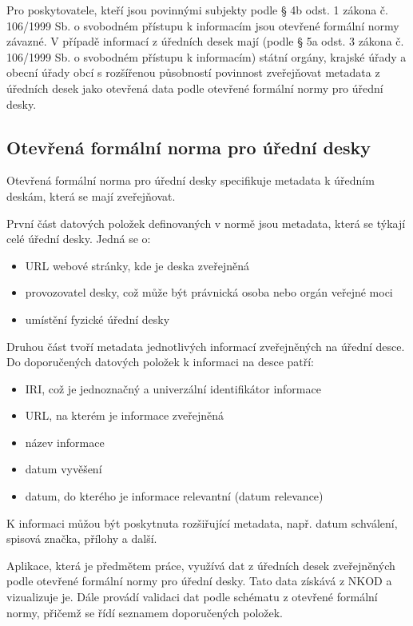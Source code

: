 Pro poskytovatele, kteří jsou povinnými subjekty podle § 4b odst. 1 zákona č. 106/1999 Sb. o svobodném přístupu k informacím\cite{ZakonSvobodny4b} jsou otevřené formální normy závazné. V případě informací z úředních desek mají (podle § 5a odst. 3 zákona č. 106/1999 Sb. o svobodném přístupu k informacím\cite{ZakonSvobodny5a}) státní orgány, krajské úřady a obecní úřady obcí s rozšířenou působností povinnost zveřejňovat metadata z úředních desek jako otevřená data podle otevřené formální normy pro úřední desky.

\subsection{Otevřená formální norma pro úřední desky}\label{subsec:ofn-uredni}

Otevřená formální norma pro úřední desky \cite{OFN-UD} specifikuje metadata k úředním deskám, která se mají zveřejňovat. 

První část datových položek definovaných v normě jsou metadata, která se týkají celé úřední desky. Jedná se o:
\begin{itemize}
    \item URL webové stránky, kde je deska zveřejněná
    \item provozovatel desky, což může být právnická osoba nebo orgán veřejné moci
    \item umístění fyzické úřední desky
\end{itemize}

Druhou část tvoří metadata jednotlivých informací zveřejněných na úřední desce. Do doporučených datových položek k informaci na desce patří:
\begin{itemize}
    \item IRI, což je jednoznačný a univerzální identifikátor informace
    \item URL, na kterém je informace zveřejněná
    \item název informace
    \item datum vyvěšení
    \item datum, do kterého je informace relevantní (datum relevance)
\end{itemize}
K informaci můžou být poskytnuta rozšiřující metadata, např. datum schválení, spisová značka, přílohy a další.

Aplikace, která je předmětem práce, využívá dat z úředních desek zveřejněných podle otevřené formální normy pro úřední desky. Tato data získává z NKOD a vizualizuje je. Dále provádí validaci dat podle schématu z otevřené formální normy, přičemž se řídí seznamem doporučených položek.

